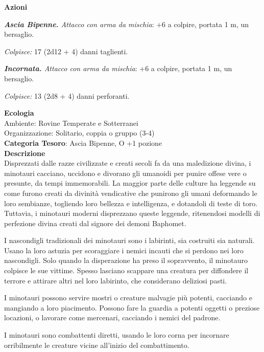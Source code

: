 \begin{multicols}{2}
{\textbf{Azioni}

\emph{\textbf{Ascia Bipenne.} Attacco con arma da mischia}: +6 a colpire, portata 1 m, un bersaglio.

\emph{Colpisce:} 17 (2d12 + 4) danni taglienti.

\emph{\textbf{Incornata.} Attacco con arma da mischia}: +6 a colpire, portata 1 m, un bersaglio.

\emph{Colpisce:} 13 (2d8 + 4) danni perforanti.

\textbf{Ecologia}\\
Ambiente: Rovine Temperate e Sotterranei\\
Organizzazione: Solitario, coppia o gruppo (3-4)\\
\textbf{Categoria Tesoro}: Ascia Bipenne, O +1 pozione\\
\textbf{Descrizione}\\
Disprezzati dalle razze civilizzate e creati secoli fa da una maledizione divina, i minotauri cacciano, uccidono e divorano gli umanoidi per punire offese vere o presunte, da tempi immemorabili. La maggior parte delle culture ha leggende su come furono creati da divinità vendicative che punirono gli umani deformando le loro sembianze, togliendo loro bellezza e intelligenza, e dotandoli di teste di toro. Tuttavia, i minotauri moderni disprezzano queste leggende, ritenendosi modelli di perfezione divina creati dal signore dei demoni Baphomet.

I nascondigli tradizionali dei minotauri sono i labirinti, sia costruiti sia naturali. Usano la loro astuzia per scoraggiare i nemici incauti che si perdono nei loro nascondigli. Solo quando la disperazione ha preso il sopravvento, il minotauro colpisce le sue vittime. Spesso lasciano scappare una creatura per diffondere il terrore e attirare altri nel loro labirinto, che considerano deliziosi pasti.

I minotauri possono servire mostri o creature malvagie più potenti, cacciando e mangiando a loro piacimento. Possono fare la guardia a potenti oggetti o preziose locazioni, o lavorare come mercenari, cacciando i nemici del padrone.

I minotauri sono combattenti diretti, usando le loro corna per incornare orribilmente le creature vicine all'inizio del combattimento.

}
\end{multicols}
